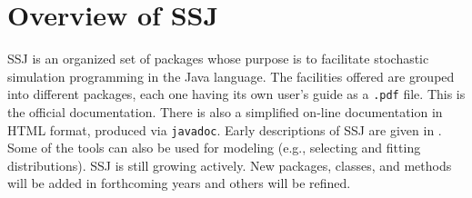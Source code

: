 
\section{Overview of SSJ}

SSJ is an organized set of packages whose purpose is to facilitate 
stochastic simulation programming in the Java language.
The facilities offered are grouped into different packages, 
each one having its own user's guide as a \texttt{.pdf} file.
This is the official documentation.
There is also a simplified on-line documentation in HTML 
format, produced via \texttt{javadoc}.
Early descriptions of SSJ are given in \cite{sLEC02a,sLEC05a}.
Some of the tools can also be used for modeling (e.g., selecting
and fitting distributions).
SSJ is still growing actively.
New packages, classes, and methods will be added in 
forthcoming years and others will be refined.







